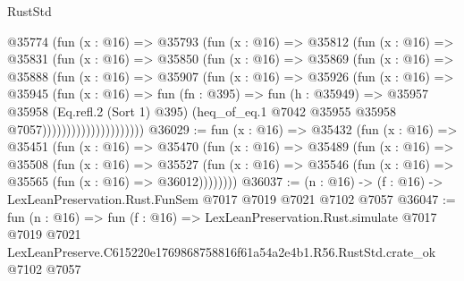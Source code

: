\begin{lexlean}{RustStd}
\begin{coremodule}
                      @35774
                        (fun (x : @16) =>
                        @35793
                          (fun (x : @16) =>
                          @35812
                            (fun (x : @16) =>
                            @35831
                              (fun (x : @16) =>
                              @35850
                                (fun (x : @16) =>
                                @35869
                                  (fun (x : @16) =>
                                  @35888
                                    (fun (x : @16) =>
                                    @35907
                                      (fun (x : @16) =>
                                      @35926
                                        (fun (x : @16) =>
                                        @35945
                                          (fun (x : @16) =>
                                          fun (fn : @395) =>
                                          fun (h : @35949) =>
                                          @35957
                                            @35958
                                            (Eq.refl.{2} (Sort 1) @395)
                                            (heq_of_eq.{1}
                                              @7042
                                              @35955
                                              @35958
                                              @7057)))))))))))))))))))))
@36029 := fun (x : @16) =>
  @35432
    (fun (x : @16) =>
    @35451
      (fun (x : @16) =>
      @35470
        (fun (x : @16) =>
        @35489
          (fun (x : @16) =>
          @35508
            (fun (x : @16) =>
            @35527
              (fun (x : @16) => @35546 (fun (x : @16) => @35565 (fun (x : @16) => @36012))))))))
@36037 := (n : @16) -> (f : @16) -> LexLeanPreservation.Rust.FunSem @7017 @7019 @7021 @7102 @7057
@36047 := fun (n : @16) =>
  fun (f : @16) =>
  LexLeanPreservation.Rust.simulate
    @7017
    @7019
    @7021
    LexLeanPreserve.C615220e1769868758816f61a54a2e4b1.R56.RustStd.crate_ok
    @7102
    @7057
\end{coremodule}
\end{lexlean}
